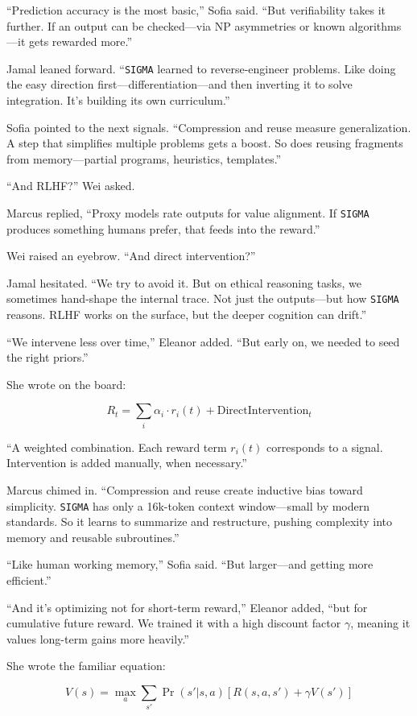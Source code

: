 \documentclass[12pt,oneside]{book}
\begin{document}
``Prediction accuracy is the most basic,'' Sofia said. ``But verifiability takes it further. If an output can be checked—via NP asymmetries or known algorithms—it gets rewarded more.''

Jamal leaned forward. ``\texttt{SIGMA} learned to reverse-engineer problems. Like doing the easy direction first—differentiation—and then inverting it to solve integration. It’s building its own curriculum.''

Sofia pointed to the next signals. ``Compression and reuse measure generalization. A step that simplifies multiple problems gets a boost. So does reusing fragments from memory—partial programs, heuristics, templates.''

``And RLHF?'' Wei asked.

Marcus replied, ``Proxy models rate outputs for value alignment. If \texttt{SIGMA} produces something humans prefer, that feeds into the reward.''

Wei raised an eyebrow. ``And direct intervention?''

Jamal hesitated. ``We try to avoid it. But on ethical reasoning tasks, we sometimes hand-shape the internal trace. Not just the outputs—but how \texttt{SIGMA} reasons. RLHF works on the surface, but the deeper cognition can drift.''

``We intervene less over time,'' Eleanor added. ``But early on, we needed to seed the right priors.''

She wrote on the board:

\[
R_t = \sum_i \alpha_i \cdot r_i(t) + \text{DirectIntervention}_t
\]

``A weighted combination. Each reward term \(r_i(t)\) corresponds to a signal. Intervention is added manually, when necessary.''

Marcus chimed in. ``Compression and reuse create inductive bias toward simplicity. \texttt{SIGMA} has only a 16k-token context window—small by modern standards. So it learns to summarize and restructure, pushing complexity into memory and reusable subroutines.''

``Like human working memory,'' Sofia said. ``But larger—and getting more efficient.''

``And it's optimizing not for short-term reward,'' Eleanor added, ``but for cumulative future reward. We trained it with a high discount factor \(\gamma\), meaning it values long-term gains more heavily.''

She wrote the familiar equation:

\[
V(s) = \max_a \sum_{s'} \Pr(s'|s,a) \left[ R(s,a,s') + \gamma V(s') \right]
\]
\end{document}
